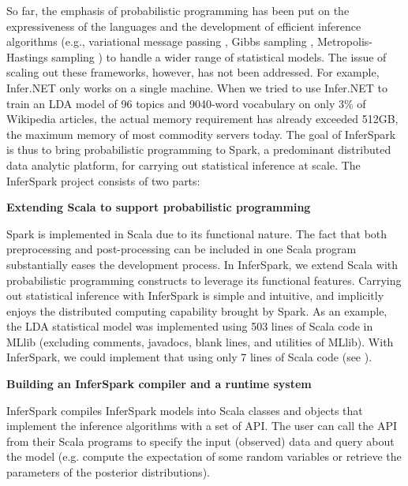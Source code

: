 So far, the emphasis of probabilistic programming has been put on the
expressiveness of the languages and the development of efficient inference
algorithms (e.g., variational message passing \cite{vmp}, Gibbs sampling \cite{gibbs},
Metropolis-Hastings sampling \cite{mh}) to handle a wider range of statistical
models.  The issue of scaling out these frameworks, however, has not been
addressed.  For example, Infer.NET only works on a single machine.  
When we tried to use Infer.NET to train an LDA model of 96 topics and 9040-word
vocabulary on only 3\% of Wikipedia articles, the actual memory
requirement has already exceeded 512GB, the maximum memory of most commodity
servers today.
The goal of InferSpark is thus to bring 
probabilistic programming to Spark, a predominant distributed data
analytic platform, for carrying out statistical inference at scale. 
The InferSpark project consists of two parts:

\begin{packed_enum}
	\item {\bf Extending Scala to support probabilistic programming}

	Spark is implemented in Scala due to its functional nature.
The fact that both preprocessing and post-processing can be 
included in one Scala program substantially eases the development process.
	In InferSpark,
	we extend Scala with probabilistic programming constructs to leverage its
	functional features.  Carrying out statistical inference with InferSpark
	is simple and intuitive, and implicitly enjoys the distributed computing
	capability brought by Spark.  As an example, the LDA statistical model was
	implemented using 503 lines of Scala code in MLlib (excluding comments,
	javadocs, blank lines, and utilities of MLlib).  With InferSpark, we could
	implement that using only 7 lines of Scala code (see
	). 
	

	\item {\bf Building an InferSpark compiler and a runtime system}
		
	InferSpark compiles InferSpark models into Scala classes
	and objects that implement the inference algorithms with a set of API. The
	user can call the API from their Scala programs to specify the input
	(observed) data and query about the model (e.g. compute the expectation of
	some random variables or retrieve the parameters of the posterior
	distributions).
		
\end{packed_enum}


